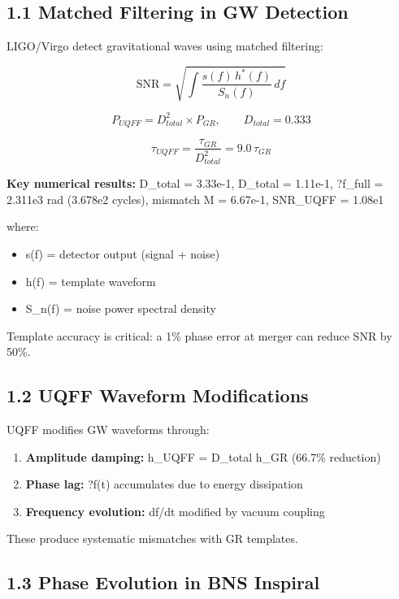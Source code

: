 \documentclass[11pt]{article}
\begin{document}
\subsection*{1.1 Matched Filtering in GW Detection}

LIGO/Virgo detect gravitational waves using matched filtering:

$$\mathrm{SNR} = \sqrt{\int \frac{s(f)\, h^*(f)}{S_n(f)}\, df}$$

$$P_{UQFF} = D^2_{total} \times P_{GR},\qquad D_{total} = 0.333$$

$$\tau_{UQFF} = \frac{\tau_{GR}}{D^2_{total}} = 9.0\, \tau_{GR}$$

\textbf{Key numerical results:} D\_total = 3.33e-1, D\_total = 1.11e-1, ?f\_full = 2.311e3 rad (3.678e2 cycles), mismatch M = 6.67e-1, SNR\_UQFF = 1.08e1

where:

\begin{itemize}
  \item s(f) = detector output (signal + noise)
  \item h(f) = template waveform
  \item S\_n(f) = noise power spectral density
\end{itemize}

Template accuracy is critical: a 1\% phase error at merger can reduce SNR by 50\%.

\subsection*{1.2 UQFF Waveform Modifications}

UQFF modifies GW waveforms through:

\begin{enumerate}
  \item \textbf{Amplitude damping:} h\_UQFF = D\_total  h\_GR (66.7\% reduction)
  \item \textbf{Phase lag:} ?f(t) accumulates due to energy dissipation
  \item \textbf{Frequency evolution:} df/dt modified by vacuum coupling
\end{enumerate}

These produce systematic mismatches with GR templates.

\subsection*{1.3 Phase Evolution in BNS Inspiral}
\end{document}
